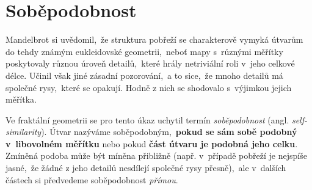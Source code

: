\section{Soběpodobnost}\label{sec:sobepodobnost}
Mandelbrot si uvědomil,~že struktura pobřeží se charakterově vymyká útvarům do tehdy známým eukleidovské geometrii,~neboť mapy s~různými měřítky poskytovaly různou úroveň detailů,~které hrály netriviální roli v~jeho celkové délce. Učinil však jiné zásadní pozorování,~a to sice,~že mnoho detailů má společné rysy,~které se opakují. Hodně z nich se shodovalo s~výjimkou jejich měřítka. \citep[str. 96]{Mandelbrot1983}\par

Ve fraktální geometrii se pro tento úkaz uchytil termín \emph{soběpodobnost} (angl. \emph{self-similarity}). Útvar nazýváme soběpodobným,~\textbf{pokud se sám sobě podobný v~libovolném měřítku} \citep[str. 220]{Voracova2022} nebo pokud \textbf{část útvaru je podobná jeho celku}. Zmíněná podoba může být míněna přibližně (např. v~případě pobřeží je nejspíše jasné,~že žádné z jeho detailů nesdílejí společné rysy přesně),~ale v~dalších částech si předvedeme soběpodobnost \emph{přímou}.

